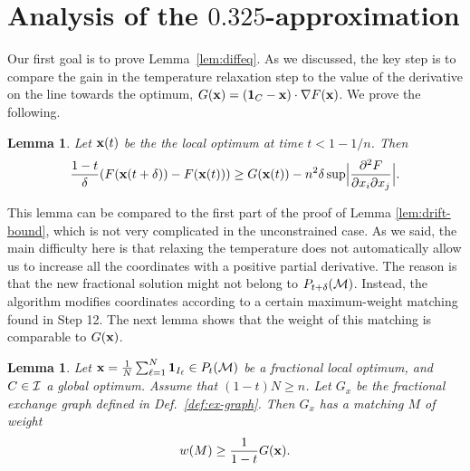 \documentclass{article}[11pt]
\newtheorem{lemma}[theorem]{Lemma}
\newcommand{\mixdiff}[3]{\frac{\partial^2 {#1}}{{\partial {#2}}{\partial {#3}}}}
\def\b1{{\bf 1}}
\def\bx{{\bf x}}
\def\cM{{\cal M}}
\def\cI{{\cal I}}
\def\sup{{\rm{sup}}}
\def\G{{G}}
\begin{document}
\section{Analysis of the $0.325$-approximation}
\label{app:matroid}

Our first goal is to prove Lemma~\ref{lem:diffeq}. As we discussed,
the key step is to compare the gain in the temperature relaxation step
to the value of the derivative on the line towards the optimum,
$G(\bx) = (\b1_C - \bx) \cdot \nabla F(\bx)$.
We prove the following.

\begin{lemma}
\label{lem:temp-gain}
Let $\bx(t)$ be the the local optimum at time $t<1-1/n$. Then
$$ \frac{1-t}{\delta} (F(\bx(t+\delta)) - F(\bx(t))) \geq 
  \G(\bx(t)) - n^2 \delta \, \sup \Big| \mixdiff{F}{x_i}{x_j} \Big|.$$
\end{lemma}

This lemma can be compared to the first part of the proof of Lemma \ref{lem:drift-bound},
which is not very complicated in the unconstrained case. As we said, the main difficulty here
is that relaxing the temperature does not automatically allow us to increase
all the coordinates with a positive partial derivative.
The reason is that the new fractional solution might not belong to $P_{t+\delta}(\cM)$.
Instead, the algorithm modifies coordinates according to a certain maximum-weight matching
found in Step 12. The next lemma shows that the weight of this matching
is comparable to $\G(\bx)$.

\begin{lemma}
\label{lem:matching}
Let $\bx = \frac{1}{N} \sum_{\ell=1}^{N} \b1_{I_\ell} \in P_t(\cM)$
be a fractional local optimum, and $C \in \cI$ a global optimum.
Assume that $(1-t)N \geq n$. Let $G_x$ be the fractional exchange graph
defined in Def.~\ref{def:ex-graph}.
Then $G_x$ has a matching $M$ of weight
$$ w(M) \geq \frac{1}{1-t} \G(\bx).$$
\end{lemma}
\end{document}
